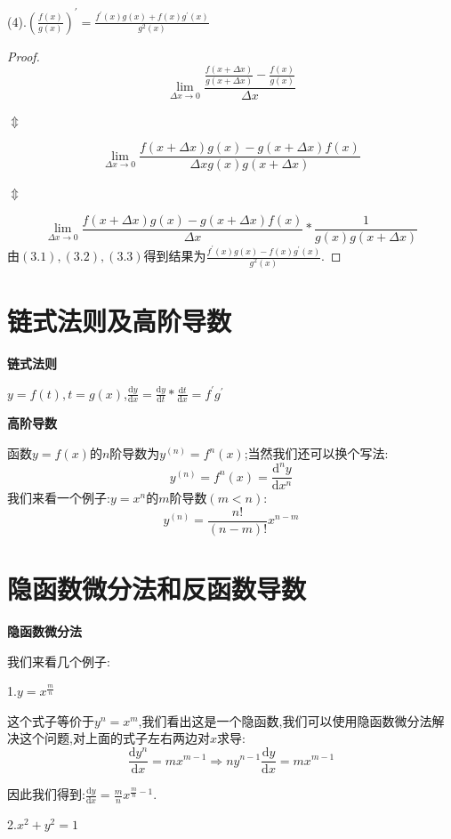 \documentclass[oneside]{book}
\begin{document}
	(4).$(\frac{f(x)}{g(x)})^{'}=\frac{f^{'}(x)g(x)+f(x)g^{'}(x)}{g^{2}(x)}$
	\begin{proof}
		\begin{equation}
		\lim\limits_{\Delta x\rightarrow 0}\frac{\frac{f(x+\Delta x)}{g(x+\Delta x)}-\frac{f(x)}{g(x)}}{\Delta x}
		\end{equation}
	\centerline{$\Updownarrow$}
		\begin{equation}
		\lim\limits_{\Delta x\rightarrow 0}\frac{f(x+\Delta x)g(x)-g(x+\Delta x)f(x)}{\Delta xg(x)g(x+\Delta x)}
		\end{equation}
	\centerline{$\Updownarrow$}
		\begin{equation}
		\lim\limits_{\Delta x\rightarrow 0}\frac{f(x+\Delta x)g(x)-g(x+\Delta x)f(x)}{\Delta x}*\frac{1}{g(x)g(x+\Delta x)}
		\end{equation}		
		由$(3.1),(3.2),(3.3)$得到结果为$\frac{f^{'}(x)g(x)-f(x)g^{'}(x)}{g^{2}(x)}$.
	\end{proof}
	\chapter{链式法则及高阶导数}
	\centerline{\textbf{链式法则}}
	
	$y=f(t),t=g(x)$,$\frac{\mathrm{d}y}{\mathrm{d}x}=\frac{\mathrm{d}y}{\mathrm{d}t}*\frac{\mathrm{d}t}{\mathrm{d}x}=f^{'}g^{'}$
	
	\centerline{\textbf{高阶导数}}
	函数$y=f(x)$的$n$阶导数为$y^{(n)}=f^{n}(x)$;当然我们还可以换个写法:
	\begin{equation}
		y^{(n)}=f^{n}(x)=\frac{\mathrm{d}^{n}y}{\mathrm{d}x^{n}}
	\end{equation}
	我们来看一个例子:$y=x^{n}$的$m$阶导数$(m<n)$:
	$$y^{(n)}=\frac{n!}{(n-m)!}x^{n-m}$$
	\chapter{隐函数微分法和反函数导数}
	\textbf{隐函数微分法}
	
	我们来看几个例子:
	
	1.$y=x^{\frac{m}{n}}$
	
	这个式子等价于$y^{n}=x^{m}$,我们看出这是一个隐函数,我们可以使用隐函数微分法解决这个问题,对上面的式子左右两边对$x$求导:
	$$\frac{\mathrm{d}y^{n}}{\mathrm{d}x}=mx^{m-1}\Rightarrow ny^{n-1}\frac{\mathrm{d}y}{\mathrm{d}x}=mx^{m-1}$$
	
	因此我们得到:$\frac{\mathrm{d}y}{\mathrm{d}x}=\frac{m}{n}x^{\frac{m}{n}-1}$.
	
	2.$x^{2}+y^{2}=1$
	
\end{document}
